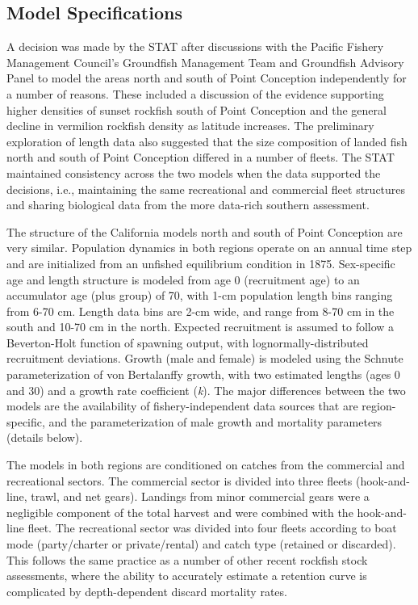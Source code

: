\documentclass[11pt,
  english,
]{article}
\begin{document}

\hypertarget{model-specifications}{%
\subsection{Model Specifications}\label{model-specifications}}

\leavevmode\tagmcend\tagstructend

A decision was made by the STAT after discussions with the Pacific Fishery Management Council's Groundfish Management Team and Groundfish Advisory Panel to model the areas north and south of Point Conception independently for a number of reasons. These included a discussion of the evidence supporting higher densities of sunset rockfish south of Point Conception and the general decline in vermilion rockfish density as latitude increases. The preliminary exploration of length data also suggested that the size composition of landed fish north and south of Point Conception differed in a number of fleets. The STAT maintained consistency across the two models when the data supported the decisions, i.e., maintaining the same recreational and commercial fleet structures and sharing biological data from the more data-rich southern assessment.

The structure of the California models north and south of Point Conception are very similar. Population dynamics in both regions operate on an annual time step and are initialized from an unfished equilibrium condition in 1875. Sex-specific age and length structure is modeled from age 0 (recruitment age) to an accumulator age (plus group) of 70, with 1-cm population length bins ranging from 6-70 cm. Length data bins are 2-cm wide, and range from 8-70 cm in the south and 10-70 cm in the north. Expected recruitment is assumed to follow a Beverton-Holt function of spawning output, with lognormally-distributed recruitment deviations. Growth (male and female) is modeled using the Schnute parameterization of von Bertalanffy growth, with two estimated lengths (ages 0 and 30) and a growth rate coefficient (\emph{k}). The major differences between the two models are the availability of fishery-independent data sources that are region-specific, and the parameterization of male growth and mortality parameters (details below).

The models in both regions are conditioned on catches from the commercial and recreational sectors. The commercial sector is divided into three fleets (hook-and-line, trawl, and net gears). Landings from minor commercial gears were a negligible component of the total harvest and were combined with the hook-and-line fleet. The recreational sector was divided into four fleets according to boat mode (party/charter or private/rental) and catch type (retained or discarded). This follows the same practice as a number of other recent rockfish stock assessments, where the ability to accurately estimate a retention curve is complicated by depth-dependent discard mortality rates.
\end{document}
